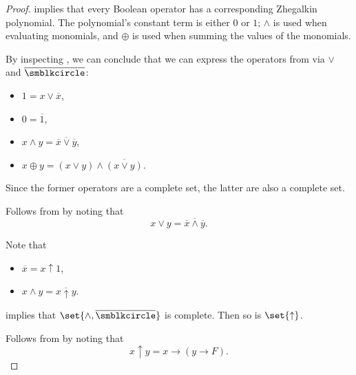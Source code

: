 \begin{proof}
    implies that every Boolean operator has a corresponding Zhegalkin polynomial. The polynomial's constant term is either \( 0 \) or \( 1 \); \( \wedge \) is used when evaluating monomials, and \( \oplus \) is used when summing the values of the monomials.

   By inspecting , we can conclude that we can express the operators from  via \( \vee \) and \( \overline{\anon} \):
  \begin{itemize}
    \item \( 1 = x \vee \overline{x} \),
    \item \( 0 = \overline{1} \),
    \item \( x \wedge y = \overline{\overline{x} \vee \overline{y}} \),
    \item \( x \oplus y = (x \vee y) \wedge \overline{(x \vee y)} \).
  \end{itemize}

  Since the former operators are a complete set, the latter are also a complete set.

   Follows from  by noting that
  \begin{equation*}
    x \vee y = \overline{\overline x \wedge \overline y}.
  \end{equation*}

   Note that
  \begin{itemize}
    \item \( \overline{x} = x \uparrow 1 \),
    \item \( x \wedge y = \overline{x \uparrow y} \).
  \end{itemize}

   implies that \( \set{ \wedge, \overline{\anon} } \) is complete. Then so is \( \set{ \uparrow } \).

   Follows from  by noting that
  \begin{equation*}
    x \uparrow y = x \rightarrow (y \rightarrow F).
  \end{equation*}
\end{proof}
